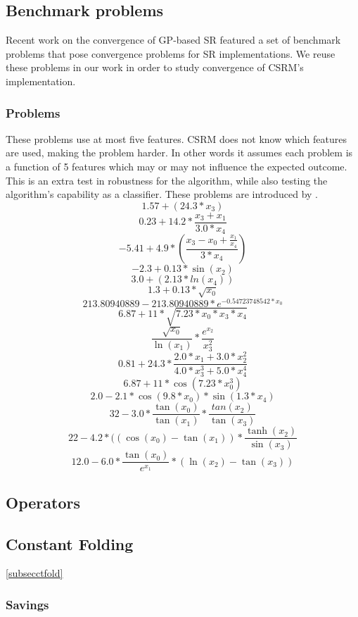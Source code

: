 \subsection{Benchmark problems}
Recent work on the convergence of GP-based SR \cite{SRAccur, SRBaseline} featured a set of benchmark problems that pose convergence problems for SR implementations. We reuse these problems in our work in order to study convergence of CSRM's implementation.
\subsubsection{Problems}
These problems use at most five features. CSRM does not know which features are used, making the problem harder. In other words it assumes each problem is a function of 5 features which may or may not influence the expected outcome. This is an extra test in robustness for the algorithm, while also testing the algorithm's capability as a classifier. These problems are introduced by \cite{SRBaseline}.
\[
1.57 + (24.3*x_3)\]
\[0.23+14.2*\frac{x_3+x_1}{3.0*x_4}
\]
\[
-5.41 + 4.9* ( \frac{x_3-x_0 +  \frac{x_1}{x_4} } {3*x_4} )
\] 
\[-2.3 + 0.13*\sin(x_2)\]
\[3.0 + (2.13 * ln(x_4))\]
\[1.3 + 0.13* \sqrt{x_0}\]
\[213.80940889 - 213.80940889*e^{-0.54723748542*x_0}\]
\[6.87+11*\sqrt{7.23*x_0*x_3*x_4}\]
\[\frac{\sqrt{x_0}}{\ln(x_1)} *\frac{e^{x_2}}{x_3 ^ 2}\]
\[ 0.81 + 24.3 * \frac{ 2.0*x_1+3.0*x_2^2} {4.0*x_3^3 + 5.0*x_4^4}\]
\[6.87+ 11* \cos(7.23*x_0^3)\]
\[2.0 - 2.1 * \cos(9.8*x_0) * \sin(1.3*x_4)\]
\[32-3.0*  \frac{\tan(x_0)}{\tan(x_1)} *  \frac{tan(x_2)} {\tan(x_3)} \]
\[22 - 4.2*((\cos(x_0)-\tan(x_1))*\frac{\tanh(x_2)}{\sin(x_3)}\]
\[12.0 - 6.0* \frac{\tan(x_0)}{e^{x_1}} * (\ln(x_2)-\tan(x_3) ) \]
                    

\subsection{Operators}


\subsection{Constant Folding}\ref{subsecctfold}
\subsubsection{Savings}

